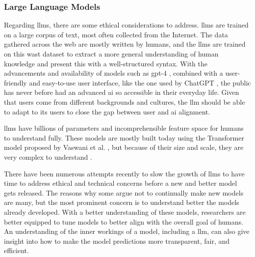 \subsubsection{Large Language Models}
Regarding \glspl{llm}, there are some ethical considerations to address. \glspl{llm} are trained on a large corpus of text, most often collected from the Internet. The data gathered across the web are mostly written by humans, and the \glspl{llm} are trained on this wast dataset to extract a more general understanding of human knowledge and present this with a well-structured syntax. With the advancements and availability of models such as \gls{gpt}-4 \cite{openaiGPT4TechnicalReport2023}, combined with a user-friendly and easy-to-use user interface, like the one used by ChatGPT \cite{ChatGPT}, the public has never before had an advanced \gls{ai} so accessible in their everyday life. Given that users come from different backgrounds and cultures, the \gls{llm} should be able to adapt to its users to close the gap between user and \gls{ai} alignment. 


\glspl{llm} have billions of parameters and incomprehensible feature space for humans to understand fully. These models are mostly built today using the Transformer model proposed by Vaswani et al. \cite{vaswaniAttentionAllYou2017}, but because of their size and scale, they are very complex to understand \cite{liptonMythosModelInterpretability2017a}. 




There have been numerous attempts recently to slow the growth of \glspl{llm} to have time to address ethical and technical concerns before a new and better model gets released. The reasons why some argue not to continually make new models are many, but the most prominent concern is to understand better the models already developed. With a better understanding of these models, researchers are better equipped to tune models to better align with the overall goal of humans. An understanding of the inner workings of a model, including a \gls{llm}, can also give insight into how to make the model predictions more transparent, fair, and efficient. 

